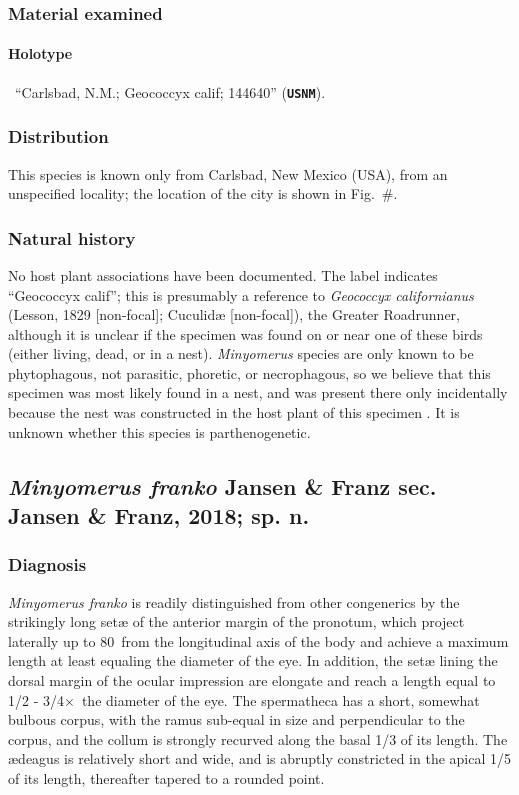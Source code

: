 \documentclass[fleqn,10pt,lineno]{wlpeerj} %
\newcommand{\td}{\textdegree~}
\newcommand{\x}{$\times$~}
\begin{document}
		\subsubsection*{Material examined}
			\paragraph{Holotype}
				\female~``Carlsbad, N.M.; Geococcyx calif; 144640'' (\texttt{\textbf{USNM}}).
		\subsubsection*{Distribution}
			This species is known only from Carlsbad, New Mexico (USA), from an unspecified locality; the location of the city is shown in Fig.~\#.
		\subsubsection*{Natural history}
			No host plant associations have been documented.
			The label indicates ``Geococcyx calif''; this is presumably a reference to \textit{Geococcyx californianus} (Lesson, 1829 [non-focal]; Cuculid{\ae} [non-focal]), the Greater Roadrunner, although it is unclear if the specimen was found on or near one of these birds (either living, dead, or in a nest).
			\textit{Minyomerus} species are only known to be phytophagous, not parasitic, phoretic, or necrophagous, so we believe that this specimen was most likely found in a nest, and was present there only incidentally because the nest was constructed in the host plant of this specimen \citep{jansen2015}.
			It is unknown whether this species is parthenogenetic.
			
	\subsection*{\textit{Minyomerus franko} Jansen \& Franz sec. Jansen \& Franz, 2018; sp. n.}
		\subsubsection*{Diagnosis}
			\textit{Minyomerus franko} is readily distinguished from other congenerics by the strikingly long set{\ae} of the anterior margin of the pronotum, which project laterally up to 80\td from the longitudinal axis of the body and achieve a maximum length at least equaling the diameter of the eye.
			In addition, the set{\ae} lining the dorsal margin of the ocular impression are elongate and reach a length equal to 1/2 - 3/4\x the diameter of the eye.
			The spermatheca has a short, somewhat bulbous corpus, with the ramus sub-equal in size and perpendicular to the corpus, and the collum is strongly recurved along the basal 1/3 of its length.
			The {\ae}deagus is relatively short and wide, and is abruptly constricted in the apical 1/5 of its length, thereafter tapered to a rounded point.
\end{document}

